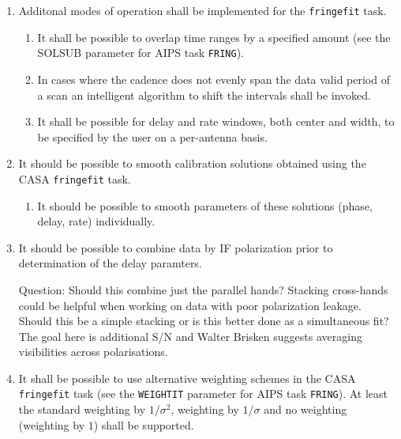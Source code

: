 \documentclass[11pt,a4paper]{article}
\begin{document}
\begin{enumerate}[subseclist]

\item Additonal modes of operation shall be implemented for the
  \texttt{fringefit} task.

\begin{enumerate}[subsecsublist]

\item It shall be possible to overlap time ranges by a specified
  amount (see the SOLSUB parameter for AIPS task \texttt{FRING}).

\item In cases where the cadence does not evenly span the data valid
  period of a scan an intelligent algorithm to shift the intervals
  shall be invoked.

\item It shall be possible for delay and rate windows, both center and
  width, to be specified by the user on a per-antenna basis.

\end{enumerate}

\item It should be possible to smooth calibration solutions obtained
  using the CASA \texttt{fringefit} task.

\begin{enumerate}[subsecsublist]

\item It should be possible to smooth parameters of these solutions
  (phase, delay, rate) individually.

\end{enumerate}

\item It should be possible to combine data by IF polarization prior
  to determination of the delay paramters.

  Question: Should this combine just the parallel hands?  Stacking
  cross-hands could be helpful when working on data with poor
  polarization leakage.  Should this be a simple stacking or is this
  better done as a simultaneous fit?  The goal here is additional S/N
  and Walter Brisken suggests averaging visibilities across
  polarisations.

\item It shall be possible to use alternative weighting schemes in
  the CASA \texttt{fringefit} task (see the \texttt{WEIGHTIT}
  parameter for AIPS task \texttt{FRING}).  At least the standard
  weighting by $1/\sigma^2$, weighting by $1/\sigma$ and no weighting
  (weighting by $1$) shall be supported.


\end{enumerate}
\end{document}
